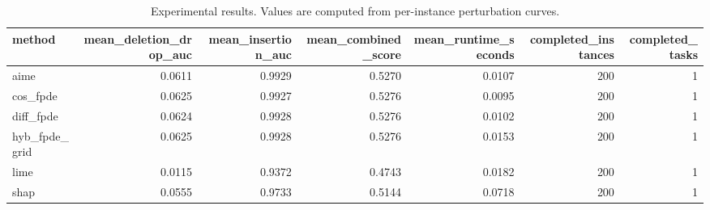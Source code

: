 \begin{table}[t]
\caption{Experimental results. Values are computed from per-instance perturbation curves.}
\label{tab:main_results_computed}
\centering
\begin{tabular}{lrrrrrr}
\toprule
method & mean\_deletion\_drop\_auc & mean\_insertion\_auc & mean\_combined\_score & mean\_runtime\_seconds & completed\_instances & completed\_tasks \\
\midrule
aime & 0.0611 & 0.9929 & 0.5270 & 0.0107 & 200 & 1 \\
cos\_fpde & 0.0625 & 0.9927 & 0.5276 & 0.0095 & 200 & 1 \\
diff\_fpde & 0.0624 & 0.9928 & 0.5276 & 0.0102 & 200 & 1 \\
hyb\_fpde\_grid & 0.0625 & 0.9928 & 0.5276 & 0.0153 & 200 & 1 \\
lime & 0.0115 & 0.9372 & 0.4743 & 0.0182 & 200 & 1 \\
shap & 0.0555 & 0.9733 & 0.5144 & 0.0718 & 200 & 1 \\
\bottomrule
\end{tabular}

\end{table}

